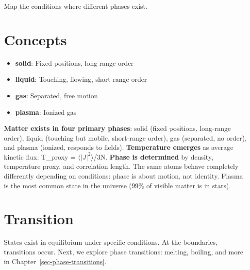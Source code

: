 \documentclass[
  11pt,
  letterpaper,
  twoside,
  openright]{book}
\providecommand{\tightlist}{%
  \setlength{\itemsep}{0pt}\setlength{\parskip}{0pt}}
\begin{document}
Map the conditions where different phases exist.

\section{Concepts}\label{concepts-8}

\begin{itemize}
\tightlist
\item
  \textbf{solid}: Fixed positions, long-range order
\item
  \textbf{liquid}: Touching, flowing, short-range order
\item
  \textbf{gas}: Separated, free motion
\item
  \textbf{plasma}: Ionized gas
\end{itemize}

\begin{tcolorbox}[enhanced jigsaw, leftrule=.75mm, title=\textcolor{quarto-callout-note-color}{\faInfo}\hspace{0.5em}{Chapter Summary}, bottomrule=.15mm, opacityback=0, coltitle=black, arc=.35mm, colframe=quarto-callout-note-color-frame, colbacktitle=quarto-callout-note-color!10!white, colback=white, titlerule=0mm, breakable, bottomtitle=1mm, toptitle=1mm, rightrule=.15mm, toprule=.15mm, left=2mm, opacitybacktitle=0.6]

\textbf{Matter exists in four primary phases}: solid (fixed positions,
long-range order), liquid (touching but mobile, short-range order), gas
(separated, no order), and plasma (ionized, responds to fields).
\textbf{Temperature emerges} as average kinetic flux: T\_proxy =
\(\langle|J|^2\rangle\)/3N. \textbf{Phase is determined} by density,
temperature proxy, and correlation length. The same atoms behave
completely differently depending on conditions: phase is about motion,
not identity. Plasma is the most common state in the universe (99\% of
visible matter is in stars).

\end{tcolorbox}

\section{Transition}\label{transition-8}

States exist in equilibrium under specific conditions. At the
boundaries, transitions occur. Next, we explore phase transitions:
melting, boiling, and more in Chapter~\ref{sec-phase-transitions}.
\end{document}
